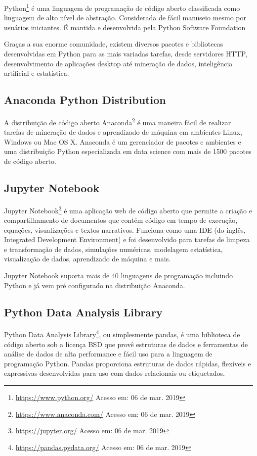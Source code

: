 Python\footnote{\url{https://www.python.org/} Acesso em: 06 de mar. 2019} é uma
linguagem de programação de código aberto classificada como linguagem de alto
nível de abstração. Considerada de fácil manuseio mesmo por usuários iniciantes.
É mantida e desenvolvida pela Python Software Foundation

Graças a sua enorme comunidade, existem diversos pacotes e bibliotecas
desenvolvidas em Python para as mais variadas tarefas, desde servidores HTTP,
desenvolvimento de aplicações desktop até mineração de dados, inteligência
artificial e estatística.

\subsection{Anaconda Python Distribution}

A distribuição de código aberto
Anaconda\footnote{\url{https://www.anaconda.com/} Acesso em: 06 de mar. 2019}  é
uma maneira fácil de realizar tarefas de mineração de dados e aprendizado de
máquina em ambientes Linux, Windows ou Mac OS X. Anaconda é um gerenciador de
pacotes e ambientes e uma distribuição Python especializada em data science com
mais de 1500 pacotes de código aberto.

\subsection{Jupyter Notebook}

Jupyter Notebook\footnote{\url{https://jupyter.org/} Acesso em: 06 de mar. 2019}
é uma aplicação web de código aberto que permite a criação e compartilhamento de
documentos que contém código em tempo de execução, equações, visualizações e
textos narrativos. Funciona como uma IDE (do inglês, Integrated Development
Environment) e foi desenvolvido para tarefas de limpeza e transformação de
dados, simulações numéricas, modelagem estatística, visualização de dados,
aprendizado de máquina e mais.

Jupyter Notebook suporta mais de 40 linguagens de programação incluindo Python e
já vem pré configurado na distribuição Anaconda.

\subsection{Python Data Analysis Library}

Python Data Analysis Library\footnote{\url{https://pandas.pydata.org/} Acesso
em: 06 de mar. 2019}, ou simplesmente pandas, é uma biblioteca de código aberto
sob a licença BSD que provê estruturas de dados e ferramentas de análise de
dados de alta performance e fácil uso para a linguagem de programação Python.
Pandas proporciona estruturas de dados rápidas, flexíveis e expressivas
desenvolvidas para uso com dados relacionais ou etiquetados.

